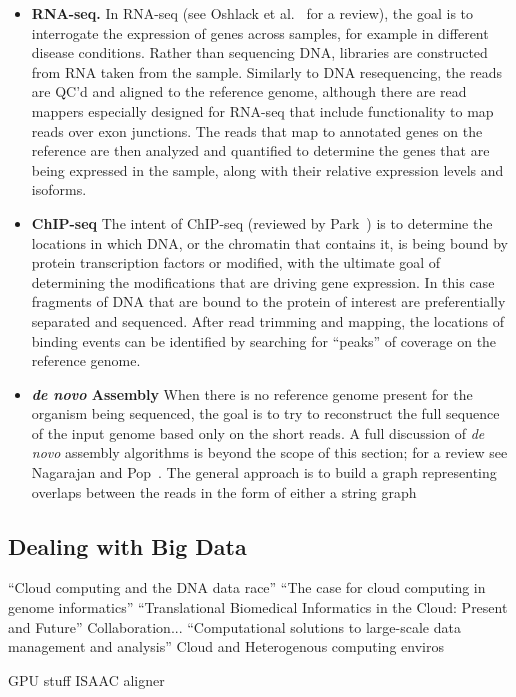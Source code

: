 \begin{itemize}
\item \textbf{RNA-seq.} In RNA-seq (see Oshlack et al.~\cite{Oshlack:2010kr} for a review), the goal is to interrogate the expression of genes across samples, for example in different disease conditions. Rather than sequencing DNA, libraries are constructed from RNA taken from the sample. Similarly to DNA resequencing, the reads are QC'd and aligned to the reference genome, although there are read mappers especially designed for RNA-seq that include functionality to map reads over exon junctions. The reads that map to annotated genes on the reference are then analyzed and quantified to determine  the genes that are being expressed in the sample, along with their relative expression levels and isoforms.

\item \textbf{ChIP-seq} The intent of ChIP-seq (reviewed by Park~\cite{Park:2009gl}) is to determine the locations in which DNA, or the chromatin that contains it, is being bound by protein transcription factors or modified, with the ultimate goal of determining the modifications that are driving gene expression. In this case fragments of DNA that are bound to the protein of interest are preferentially separated and sequenced. After read trimming and mapping, the locations of binding events can be identified by searching for ``peaks'' of coverage on the reference genome.

\item \textbf{\emph{de novo} Assembly} When there is no reference genome present for the organism being sequenced, the goal is to try to reconstruct the full sequence of the input genome based only on the short reads. A full discussion of \emph{de novo} assembly algorithms is beyond the scope of this section; for a review see Nagarajan and Pop~\cite{Nagarajan:2013cq}. The general approach is to build a graph representing overlaps between the reads in the form of either a string graph~\cite{Myers:2005iq}

\end{itemize}

\subsection{Dealing with Big Data}

``Cloud computing and the DNA data race''\cite{Schatz:2010js}
``The case for cloud computing in genome informatics''\cite{Stein:2010gp}
``Translational Biomedical Informatics in the Cloud: Present and Future''\cite{Chen:2013ci} Collaboration...
``Computational solutions to large-scale data management and analysis''\cite{Schadt:2010dp} Cloud and Heterogenous computing enviros


GPU stuff
ISAAC aligner~\cite{Raczy:2013hy}